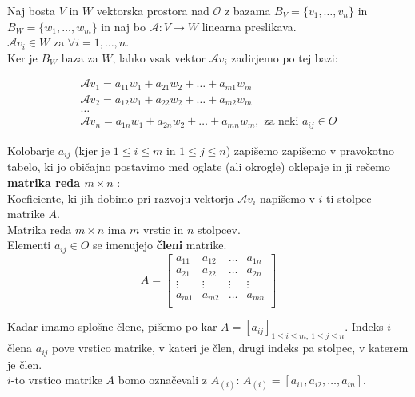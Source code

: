 \documentclass[a4paper,12pt]{article}
\newcommand{\A}{\mathcal{A}}
\begin{document}
Naj bosta $V$ in $W$ vektorska prostora nad $\mathcal{O}$ z bazama $B_V=\{v_1,\ldots,v_n\}$ in \linebreak $B_W=\{w_1,\ldots,w_m\}$ in naj bo $\A :V\to W$ linearna preslikava. \\

$\A v_i\in W$ za $\forall i =1,\ldots,n$. \\

Ker je $B_W$ baza za $W$, lahko vsak vektor $\A v_i$ zadirjemo po tej  bazi:

\begin{gather*}
	\A v_1=a_{11}w_1+a_{21}w_2+\ldots+a_{m1}w_m \\
	\A v_2=a_{12}w_1+a_{22}w_2+\ldots+a_{m2}w_m \\
	\ldots \\
	\A v_n=a_{1n}w_1+a_{2n}w_2+\ldots+a_{mn}w_m,\text{ za neki }a_{ij}\in O
\end{gather*}

Kolobarje $a_{ij}$ (kjer je $1 \leq i \leq m$ in $1 \leq j \leq n$) zapišemo zapišemo v pravokotno tabelo, ki jo običajno postavimo med oglate (ali okrogle) oklepaje in ji rečemo \textbf{matrika reda $m\times n$ }:\\

Koeficiente, ki jih dobimo pri razvoju vektorja $\A v_i$ napišemo v $i$-ti stolpec matrike $A$. \\

Matrika reda $m\times n$ ima $m$ vrstic in $n$ stolpcev. \\

Elementi $a_{ij}\in O$ se imenujejo \textbf{členi} matrike. \\

$$A=
\begin{bmatrix}
	a_{11} & a_{12} & \ldots & a_{1n} \\
	a_{21} & a_{22} & \ldots & a_{2n} \\
	\vdots & \vdots & \vdots & \vdots \\
	a_{m1} & a_{m2} & \ldots & a_{mn} \\
\end{bmatrix}
$$

\newpage 

Kadar imamo splošne člene, pišemo po kar $A=[a_{ij}]_{1 \leq i \leq m,~ 1\leq j \leq n}$. Indeks $i$ člena $a_{ij}$ pove vrstico matrike, v kateri je člen, drugi indeks pa stolpec, v katerem je člen. \\

$i$-to vrstico matrike $A$ bomo označevali z $A_{(i)}$: $A_{(i)}=[a_{i1},a_{i2},\ldots,a_{in}]$.\\
\end{document}
